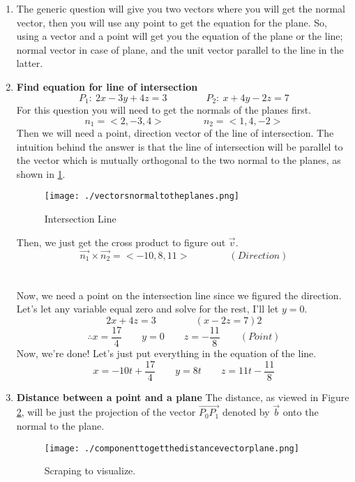 \documentclass{article}
\begin{document}
\begin{enumerate}[1.]
		\item The generic question will give you two vectors where you will get the normal vector, then you will use any point to get the equation for the plane. So, using a vector and a point will get you the equation of the plane or the line; normal vector in case of plane, and the unit vector parallel to the line in the latter.

		\item \textbf{Find equation for line of intersection} \[
				P_1:\ 2x-3y+4z=3 \qquad \qquad P_2:\ x+4y-2z=7
			\]
			For this question you will need to get the normals of the planes first.
			\[
				n_1=<2,-3,4> \qquad \qquad n_2=<1,4,-2>
			\]
			Then we will need a point, direction vector of the line of intersection. The intuition behind the answer is that the line of intersection will be parallel to the vector which is mutually orthogonal to the two normal to the planes, as shown in \ref{fig:-vectorsnormaltotheplanes-png}.

			\begin{figure}[h!] 
				\centering
				\texttt{[image: ./vectorsnormaltotheplanes.png]}
				\caption{Intersection Line}
				\label{fig:-vectorsnormaltotheplanes-png}
			\end{figure}

			Then, we just get the cross product to figure out $\vec{v}$. 
			\[
				\vec{ n_1 } \times \vec{ n_2 } = <-10,8,11> \qquad \qquad (Direction)
			\]\\\\
			Now, we need a point on the intersection line since we figured the direction. 
			Let's let any variable equal zero and solve for the rest, I'll let $y=0$. 
			\[
				2x+4z=3 \qquad \qquad
				(x-2z=7)2 	
			\]
			\[
				\therefore x = \frac{17}{4} \qquad y = 0 \qquad z = -\frac{11}{8} \qquad (Point)
			\]
			Now, we're done! Let's just put everything in the equation of the line.
			\[
				x = -10t+\frac{17}{4} \qquad y=8t \qquad z= 11t-\frac{11}{8}
			\]
		\item \textbf{Distance between a point and a plane}
			The distance, as viewed in Figure \ref{fig:scapingdistance_1}, will be just the projection of the vector $ \vec{ P_0P_1 } $ denoted by $ \vec{ b } $ onto the normal to the plane. 
			\begin{figure}[h!]
				\centering
				\texttt{[image: ./componenttogetthedistancevectorplane.png]}
				\caption{Scraping to visualize.}
				\label{fig:scapingdistance_1}
			\end{figure}	


\end{enumerate}
\end{document}
